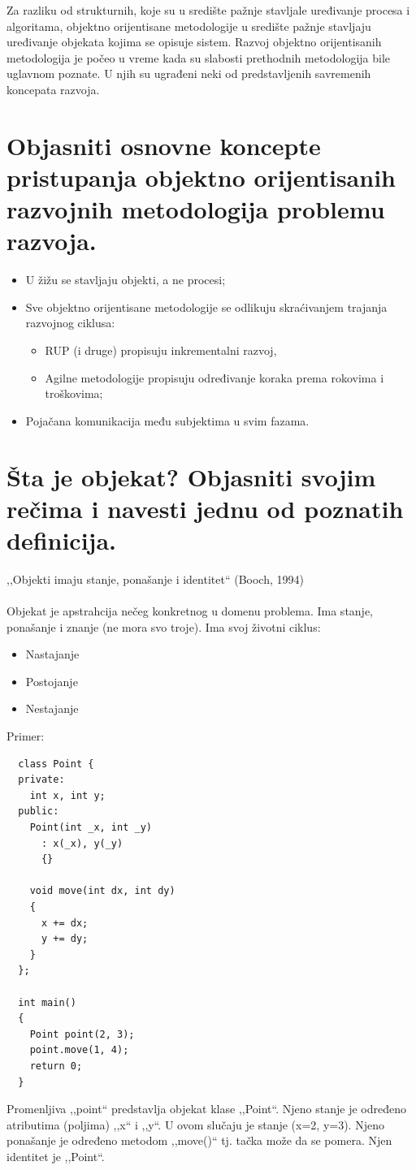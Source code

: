 \documentclass[a4paper]{article}
\begin{document}
  Za razliku od strukturnih, koje su u središte pažnje stavljale uređivanje procesa i algoritama, 
  objektno orijentisane metodologije u središte pažnje stavljaju uređivanje objekata kojima se opisuje 
  sistem. Razvoj objektno orijentisanih metodologija je počeo u vreme kada su slabosti prethodnih 
  metodologija bile uglavnom poznate. U njih su ugrađeni neki od predstavljenih savremenih koncepata 
  razvoja.

\section{Objasniti osnovne koncepte pristupanja objektno orijentisanih razvojnih metodologija 
         problemu razvoja.}
  \begin{itemize}
    \item U žižu se stavljaju objekti, a ne procesi;
    \item Sve objektno orijentisane metodologije se odlikuju skraćivanjem trajanja razvojnog ciklusa:
          \begin{itemize}
            \item RUP (i druge) propisuju inkrementalni razvoj,
            \item Agilne metodologije propisuju određivanje koraka prema rokovima i troškovima;
          \end{itemize}
    \item Pojačana komunikacija među subjektima u svim fazama.
  \end{itemize}


\section{Šta je objekat? Objasniti svojim rečima i navesti jednu od poznatih definicija.}
  ,,Objekti imaju stanje, ponašanje i identitet`` (Booch, 1994)\\\\

  Objekat je apstrahcija nečeg konkretnog u domenu problema.
  Ima stanje, ponašanje i znanje (ne mora svo troje). Ima svoj životni
  ciklus:
    \begin{itemize}
      \item Nastajanje
      \item Postojanje
      \item Nestajanje
    \end{itemize}
    

  Primer:
  \begin{lstlisting}
  class Point {
  private:
    int x, int y;
  public:
    Point(int _x, int _y)
      : x(_x), y(_y)
      {}

    void move(int dx, int dy)
    {
      x += dx;
      y += dy;
    }
  };

  int main()
  {
    Point point(2, 3);
    point.move(1, 4);
    return 0;
  }\end{lstlisting}
  Promenljiva ,,point`` predstavlja objekat klase ,,Point``. Njeno stanje je određeno
  atributima (poljima) ,,x`` i ,,y``. U ovom slučaju je stanje (x=2, y=3). Njeno ponašanje je 
  određeno metodom ,,move()`` tj. tačka može da se pomera. Njen identitet je ,,Point``.
\end{document}
